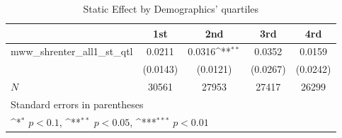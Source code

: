 \begin{table}[htbp]\centering
\def\sym#1{\ifmmode^{#1}\else\(^{#1}\)\fi}
\caption{Static Effect by Demographics' quartiles}
\begin{tabular}{l*{4}{c}}
\hline\hline
            &\multicolumn{1}{c}{1st}&\multicolumn{1}{c}{2nd}&\multicolumn{1}{c}{3rd}&\multicolumn{1}{c}{4rd}\\
\hline
mww\_shrenter\_all1\_st\_qtl&      0.0211         &      0.0316\sym{**} &      0.0352         &      0.0159         \\
            &    (0.0143)         &    (0.0121)         &    (0.0267)         &    (0.0242)         \\
\hline
\(N\)       &       30561         &       27953         &       27417         &       26299         \\
\hline\hline
\multicolumn{5}{l}{\footnotesize Standard errors in parentheses}\\
\multicolumn{5}{l}{\footnotesize \sym{*} \(p<0.1\), \sym{**} \(p<0.05\), \sym{***} \(p<0.01\)}\\
\end{tabular}
\end{table}
